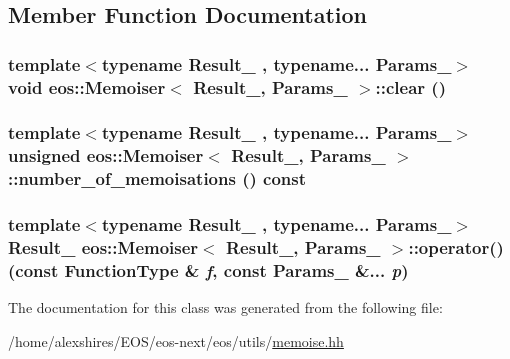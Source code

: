 \subsection{Member Function Documentation}
\hypertarget{classeos_1_1Memoiser_a353f1f69dd0ff3308fb585301f73b168}{
\subsubsection[{clear}]{\setlength{\rightskip}{0pt plus 5cm}template$<$typename Result\_\- , typename... Params\_\-$>$ void {\bf eos::Memoiser}$<$ Result\_\-, Params\_\- $>$::clear ()}}
\label{classeos_1_1Memoiser_a353f1f69dd0ff3308fb585301f73b168}
\hypertarget{classeos_1_1Memoiser_ab3f142b5355fa1f2d8ee483aa4ad8982}{
\subsubsection[{number\_\-of\_\-memoisations}]{\setlength{\rightskip}{0pt plus 5cm}template$<$typename Result\_\- , typename... Params\_\-$>$ unsigned {\bf eos::Memoiser}$<$ Result\_\-, Params\_\- $>$::number\_\-of\_\-memoisations () const}}
\label{classeos_1_1Memoiser_ab3f142b5355fa1f2d8ee483aa4ad8982}
\hypertarget{classeos_1_1Memoiser_a3850676222d9601549fc69e3fa76e959}{
\subsubsection[{operator()}]{\setlength{\rightskip}{0pt plus 5cm}template$<$typename Result\_\- , typename... Params\_\-$>$ Result\_\- {\bf eos::Memoiser}$<$ Result\_\-, Params\_\- $>$::operator() (const {\bf FunctionType} \& {\em f}, \/  const Params\_\- \&... {\em p})}}
\label{classeos_1_1Memoiser_a3850676222d9601549fc69e3fa76e959}


The documentation for this class was generated from the following file:\begin{DoxyCompactItemize}
\item 
/home/alexshires/EOS/eos-\/next/eos/utils/\hyperlink{memoise_8hh}{memoise.hh}\end{DoxyCompactItemize}
